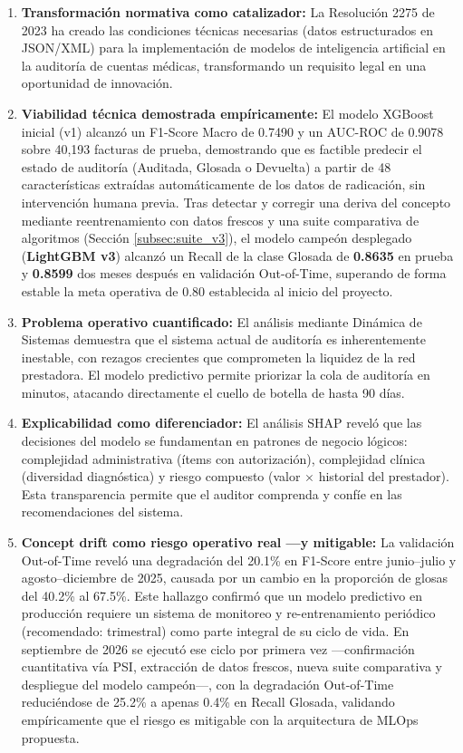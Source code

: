 \documentclass[12pt,letterpaper]{report}
\begin{document}
\begin{enumerate}
    \item \textbf{Transformación normativa como catalizador:} La Resolución 2275 de 2023 ha creado las condiciones técnicas necesarias (datos estructurados en JSON/XML) para la implementación de modelos de inteligencia artificial en la auditoría de cuentas médicas, transformando un requisito legal en una oportunidad de innovación.

    \item \textbf{Viabilidad técnica demostrada empíricamente:} El modelo XGBoost inicial (v1) alcanzó un F1-Score Macro de 0.7490 y un AUC-ROC de 0.9078 sobre 40,193 facturas de prueba, demostrando que es factible predecir el estado de auditoría (Auditada, Glosada o Devuelta) a partir de 48 características extraídas automáticamente de los datos de radicación, sin intervención humana previa. Tras detectar y corregir una deriva del concepto mediante reentrenamiento con datos frescos y una suite comparativa de algoritmos (Sección \ref{subsec:suite_v3}), el modelo campeón desplegado (\textbf{LightGBM v3}) alcanzó un Recall de la clase Glosada de \textbf{0.8635} en prueba y \textbf{0.8599} dos meses después en validación Out-of-Time, superando de forma estable la meta operativa de 0.80 establecida al inicio del proyecto.

    \item \textbf{Problema operativo cuantificado:} El análisis mediante Dinámica de Sistemas demuestra que el sistema actual de auditoría es inherentemente inestable, con rezagos crecientes que comprometen la liquidez de la red prestadora. El modelo predictivo permite priorizar la cola de auditoría en minutos, atacando directamente el cuello de botella de hasta 90 días.

    \item \textbf{Explicabilidad como diferenciador:} El análisis SHAP reveló que las decisiones del modelo se fundamentan en patrones de negocio lógicos: complejidad administrativa (ítems con autorización), complejidad clínica (diversidad diagnóstica) y riesgo compuesto (valor $\times$ historial del prestador). Esta transparencia permite que el auditor comprenda y confíe en las recomendaciones del sistema.

    \item \textbf{Concept drift como riesgo operativo real —y mitigable:} La validación Out-of-Time reveló una degradación del 20.1\% en F1-Score entre junio--julio y agosto--diciembre de 2025, causada por un cambio en la proporción de glosas del 40.2\% al 67.5\%. Este hallazgo confirmó que un modelo predictivo en producción requiere un sistema de monitoreo y re-entrenamiento periódico (recomendado: trimestral) como parte integral de su ciclo de vida. En septiembre de 2026 se ejecutó ese ciclo por primera vez —confirmación cuantitativa vía PSI, extracción de datos frescos, nueva suite comparativa y despliegue del modelo campeón—, con la degradación Out-of-Time reduciéndose de 25.2\% a apenas 0.4\% en Recall Glosada, validando empíricamente que el riesgo es mitigable con la arquitectura de MLOps propuesta.


\end{enumerate}
\end{document}
